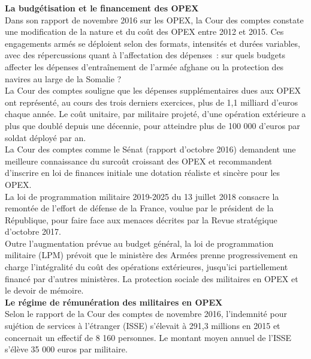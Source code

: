 \documentclass[8pt]{article}
\begin{document}
\textbf{La budgétisation et le financement des OPEX}\\

Dans son rapport de novembre 2016 sur les OPEX, la Cour des comptes constate une modification de la nature et du coût des OPEX entre 2012 et 2015. Ces engagements armés se déploient selon des formats, intensités et durées variables, avec des répercussions quant à l’affectation des dépenses~: sur quels budgets affecter les dépenses d’entraînement de l’armée afghane ou la protection des navires au large de la Somalie ?\\

La Cour des comptes souligne que les dépenses supplémentaires dues aux OPEX ont représenté, au cours des trois derniers exercices, plus de 1,1 milliard d’euros chaque année. Le coût unitaire, par militaire projeté, d’une opération extérieure a plus que doublé depuis une décennie, pour atteindre plus de 100 000 d’euros par soldat déployé par an.\\

La Cour des comptes comme le Sénat (rapport d’octobre 2016) demandent une meilleure connaissance du surcoût croissant des OPEX et recommandent d’inscrire en loi de finances initiale une dotation réaliste et sincère pour les OPEX.\\

La loi de programmation militaire 2019-2025 du 13 juillet 2018 consacre la remontée de l’effort de défense de la France, voulue par le président de la République, pour faire face aux menaces décrites par la Revue stratégique d’octobre 2017.\\

Outre l’augmentation prévue au budget général, la loi de programmation militaire (LPM) prévoit que le ministère des Armées prenne progressivement en charge l’intégralité du coût des opérations extérieures, jusqu’ici partiellement financé par d’autres ministères.
La protection sociale des militaires en OPEX et le devoir de mémoire.\\

\textbf{Le régime de rémunération des militaires en OPEX}\\

Selon le rapport de la Cour des comptes de novembre 2016, l’indemnité pour sujétion de services à l’étranger (ISSE) s’élevait à 291,3 millions en 2015 et concernait un effectif de 8 160 personnes. Le montant moyen annuel de l’ISSE s’élève 35 000 euros par militaire.\\
\end{document}
